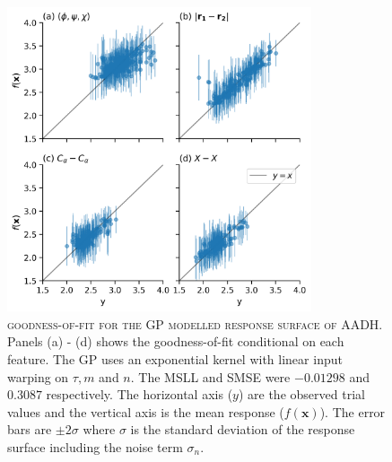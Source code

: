 \begin{figure}
    \centering
    \includegraphics[width=0.8\textwidth]{chapters/msm_optimization/figures/aadh_response_surface_fit_d.png}
    \caption[goodness-of-fit for the GP modelled response surface of AADH]{\textsc{goodness-of-fit for the GP modelled response surface of AADH}.  Panels (a) - (d) shows the goodness-of-fit conditional on each feature. The GP uses an exponential kernel with linear input warping on $\tau, m$ and $n$. The MSLL and SMSE were $-0.01298$ and  $0.3087$ respectively. The horizontal axis ($y$) are the observed trial values and the vertical axis is the mean response ($f(\mathbf{x})$). The error bars are $\pm 2\sigma$ where $\sigma$ is the standard deviation of the response surface including the noise term $\sigma_n$.}
    \label{fig:aadh_rsm_fit}
\end{figure}

